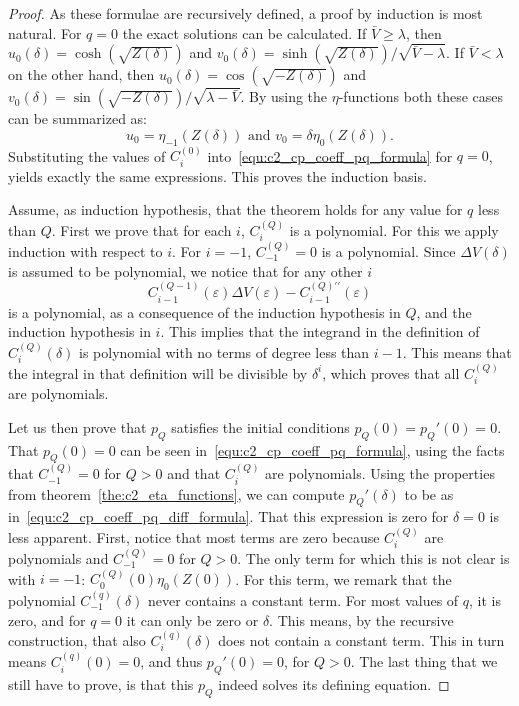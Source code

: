 \begin{proof}
As these formulae are recursively defined, a proof by induction is most natural. For $q=0$ the exact solutions can be calculated. If $\bar{V} \geq \lambda$, then $u_0(\delta) = \cosh(\sqrt{Z(\delta)})$ and $v_0(\delta) = \sinh(\sqrt{Z(\delta)})/\sqrt{\bar{V} - \lambda}$. If $\bar{V} < \lambda$ on the other hand, then $u_0(\delta) = \cos(\sqrt{-Z(\delta)})$ and $v_0(\delta) = \sin(\sqrt{-Z(\delta)})/\sqrt{\lambda - \bar{V}}$. By using the $\eta$-functions both these cases can be summarized as:
$$ u_0 = \eta_{-1}(Z(\delta)) \text{ and } v_0 = \delta\eta_{0}(Z(\delta))\text{.}$$
Substituting the values of $C^{(0)}_i$ into~\eqref{equ:c2_cp_coeff_pq_formula} for $q=0$, yields exactly the same expressions. This proves the induction basis.

Assume, as induction hypothesis, that the theorem holds for any value for $q$ less than $Q$. First we prove that for each $i$, $C_i^{(Q)}$ is a polynomial. For this we apply induction with respect to $i$. For $i = -1$, $C^{(Q)}_{-1} = 0$ is a polynomial. Since $\Delta V(\delta)$ is assumed to be polynomial, we notice that for any other $i$
$$
    C_{i-1}^{(Q-1)}(\varepsilon) \Delta V(\varepsilon) - C_{i-1}^{(Q)\prime\prime}(\varepsilon)
$$
is a polynomial, as a consequence of the induction hypothesis in $Q$, and the induction hypothesis in $i$. This implies that the integrand in the definition of $C_i^{(Q)}(\delta)$ is polynomial with no terms of degree less than $i-1$. This means that the integral in that definition will be divisible by $\delta^i$, which proves that all $C_{i}^{(Q)}$ are polynomials.

Let us then prove that $p_Q$ satisfies the initial conditions $p_Q(0) = p_Q'(0) = 0$. That $p_Q(0) = 0$ can be seen in~\eqref{equ:c2_cp_coeff_pq_formula}, using the facts that $C^{(Q)}_{-1} = 0$ for $Q > 0$ and that $C_i^{(Q)}$ are polynomials. Using the properties from theorem~\ref{the:c2_eta_functions}, we can compute $p_Q'(\delta)$ to be as in~\eqref{equ:c2_cp_coeff_pq_diff_formula}. That this expression is zero for $\delta = 0$ is less apparent. First, notice that most terms are zero because $C_i^{(Q)}$ are polynomials and $C^{(Q)}_{-1} = 0$ for $Q > 0$. The only term for which this is not clear is with $i = -1$: $C_0^{(Q)}(0)\eta_{0}(Z(0))$. For this term, we remark that the polynomial $C^{(q)}_{-1}(\delta)$ never contains a constant term. For most values of $q$, it is zero, and for $q=0$ it can only be zero or $\delta$. This means, by the recursive construction, that also $C_{i}^{(q)}(\delta)$ does not contain a constant term. This in turn means $C_{i}^{(q)}(0) = 0$, and thus $p_Q'(0) = 0$, for $Q > 0$. The last thing that we still have to prove, is that this $p_Q$ indeed solves its defining equation.


\end{proof}
